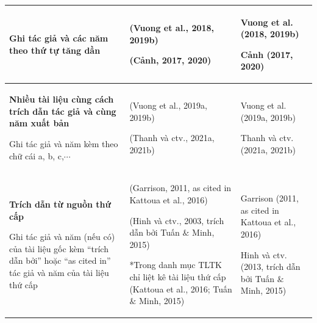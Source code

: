 \documentclass[a4paper,oneside]{thesis}
\begin{document}
\begin{table}
\begin{tabular}{|l|l|l|}
Ghi tác giả và các năm theo thứ tự tăng dần
    & (Vuong et al., 2018, 2019b)

(Cảnh, 2017, 2020)
 & Vuong et al. (2018, 2019b)

Cảnh (2017, 2020)
 \\
         \hline
  \textbf{Nhiều tài liệu cùng cách trích dẫn tác giả và cùng năm xuất bản}
  
Ghi tác giả và năm kèm theo chữ cái a, b, c,$\cdots$ & (Vuong et al., 2019a, 2019b)

(Thanh và ctv., 2021a, 2021b)
 & Vuong et al. (2019a, 2019b)

Thanh và ctv. (2021a, 2021b)
\\
         \hline
      \textbf{Trích dẫn từ nguồn thứ cấp}
      
Ghi tác giả và năm (nếu có) của tài liệu gốc kèm “trích dẫn bởi” hoặc “as cited in” tác giả và năm của tài liệu thứ cấp
   & (Garrison, 2011, as cited in Kattoua et al., 2016)

(Hinh và ctv., 2003, trích dẫn bởi Tuấn $\&$ Minh, 2015)

*Trong danh mục TLTK chỉ liệt kê tài liệu thứ cấp (Kattoua et al., 2016; Tuấn $\&$ Minh, 2015)
 & Garrison (2011, as cited in Kattoua et al., 2016) 

Hinh và ctv. (2013, trích dẫn bởi Tuấn $\&$ Minh, 2015)
\\
        \hline
  \end{tabular}
\end{table}
\end{document}
